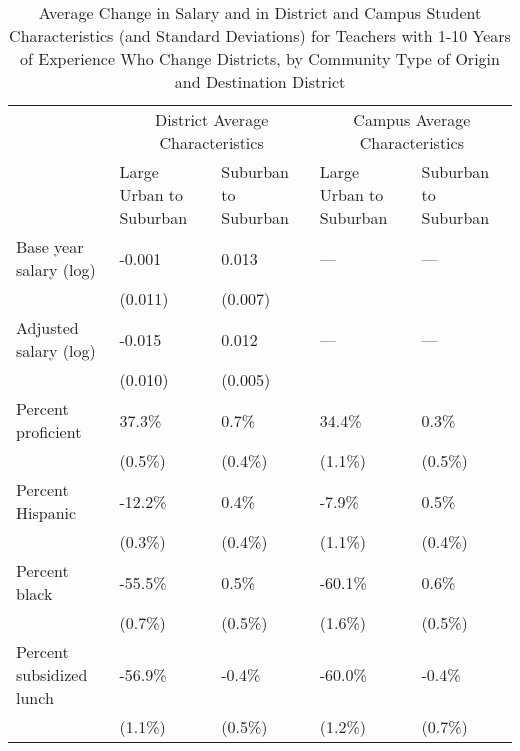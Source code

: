 \documentclass[]{article}
\begin{document}
\begin{table}[ht]
\centering
\begin{tabular}{lp{}p{}p{}p{}}
  \hline
 & \multicolumn{2}{c}{District Average Characteristics} & \multicolumn{2}{c}{Campus Average Characteristics}\\ \cline{2-5}
 & Large Urban to Suburban & Suburban to Suburban & Large Urban to Suburban & Suburban to Suburban \\
  \hline
Base year salary (log) & -0.001 & 0.013 & --- & --- \\ 
   & (0.011) & (0.007) &  &  \\ 
  Adjusted salary (log) & -0.015 & 0.012 & --- & --- \\ 
   & (0.010) & (0.005) &  &  \\ 
  Percent proficient & 37.3\% & 0.7\% & 34.4\% & 0.3\% \\ 
   & (0.5\%) & (0.4\%) & (1.1\%) & (0.5\%) \\ 
  Percent Hispanic & -12.2\% & 0.4\% & -7.9\% & 0.5\% \\ 
   & (0.3\%) & (0.4\%) & (1.1\%) & (0.4\%) \\ 
  Percent black & -55.5\% & 0.5\% & -60.1\% & 0.6\% \\ 
   & (0.7\%) & (0.5\%) & (1.6\%) & (0.5\%) \\ 
  Percent subsidized lunch & -56.9\% & -0.4\% & -60.0\% & -0.4\% \\ 
   & (1.1\%) & (0.5\%) & (1.2\%) & (0.7\%) \\ 
   \hline
\end{tabular}
\caption{Average Change in Salary and in District and Campus Student Characteristics (and Standard Deviations) for Teachers with 1-10 Years of Experience Who Change Districts, by Community Type of Origin and Destination District} 
\label{tbl:change_by_urb}
\end{table}
\end{document}
